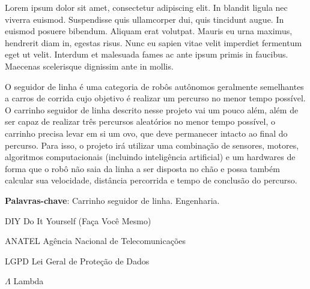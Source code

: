\documentclass[
  12pt, %
  openright, %
  twoside, %
  a4paper, %
  english, %
  french, %
  spanish, %
  brazil %
]{abntex2}
\newcommand{\listofquadrosname}{Lista de quadros}
\begin{document}
%
%
\begin{agradecimentos}
  Lorem ipsum dolor sit amet, consectetur adipiscing elit. In blandit ligula nec
  viverra euismod. Suspendisse quis ullamcorper dui, quis tincidunt augue. In
  euismod posuere bibendum. Aliquam erat volutpat. Mauris eu urna maximus,
  hendrerit diam in, egestas risus. Nunc eu sapien vitae velit imperdiet
  fermentum eget ut velit. Interdum et malesuada fames ac ante ipsum primis in
  faucibus. Maecenas scelerisque dignissim ante in mollis.
\end{agradecimentos}

%
%

\setlength{\absparsep}{18pt}
\begin{resumo}
  O seguidor de linha é uma categoria de robôs autônomos geralmente semelhantes
  a carros de corrida cujo objetivo é realizar um percurso no menor tempo
  possível. O carrinho seguidor de linha descrito nesse projeto vai um pouco
  além, além de ser capaz de realizar três percursos aleatórios no menor tempo
  possível, o carrinho precisa levar em si um ovo, que deve permanecer intacto
  ao final do percurso. Para isso, o projeto irá utilizar uma combinação de
  sensores, motores, algoritmos computacionais (incluindo inteligência
  artificial) e um hardwares de forma que o robô não saia da linha a ser
  disposta no chão e possa também calcular sua velocidade, distância percorrida
  e tempo de conclusão do percurso.

 \textbf{Palavras-chave}: Carrinho seguidor de linha. Engenharia.
\end{resumo}

%
%
\listoffigures*
\cleardoublepage

%
%
\pdfbookmark[0]{\listofquadrosname}{loq}
\listofquadros*
\cleardoublepage

%
%
\begin{siglas}
  \item[DIY] Do It Yourself (Faça Você Mesmo)
  \item[ANATEL] Agência Nacional de Telecomunicações
  \item[LGPD] Lei Geral de Proteção de Dados
\end{siglas}

%
%
\begin{simbolos}
  \item[$ \Lambda $] Lambda
\end{simbolos}
\end{document}
